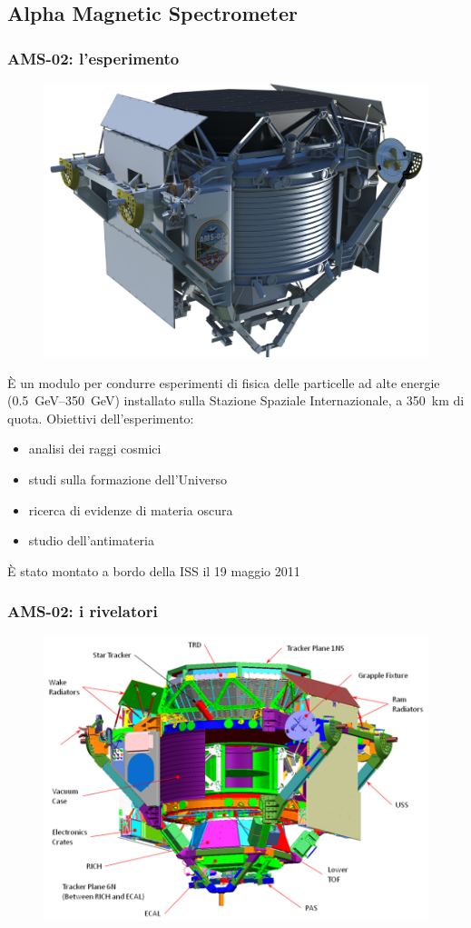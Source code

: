 \documentclass[10pt]{beamer}
\begin{document}
\subsection{Alpha Magnetic Spectrometer}

\begin{frame}
  \frametitle{AMS-02: l'esperimento}
  \begin{figure}
    \centering
    \includegraphics[width=0.3\columnwidth]{ams}
  \end{figure}
  È un modulo per condurre esperimenti di fisica delle particelle ad alte
  energie (\SIrange[range-phrase=--]{0.5}{350}{\giga\electronvolt}) installato
  sulla Stazione Spaziale Internazionale, a \SI{350}{\kilo\metre} di quota.
  Obiettivi dell'esperimento:
  \begin{itemize}
  \item analisi dei \alert{raggi cosmici}
  \item studi sulla \alert{formazione dell'Universo}
  \item ricerca di evidenze di \alert{materia oscura}
  \item studio dell'\alert{antimateria}
  \end{itemize}
  È stato montato a bordo della ISS il 19 maggio 2011
\end{frame}

\begin{frame}
  \frametitle{AMS-02: i rivelatori}
  \begin{figure}
    \centering
    \includegraphics[width=.85\columnwidth]{ams-rivelatori}
  \end{figure}
\end{frame}
\end{document}

